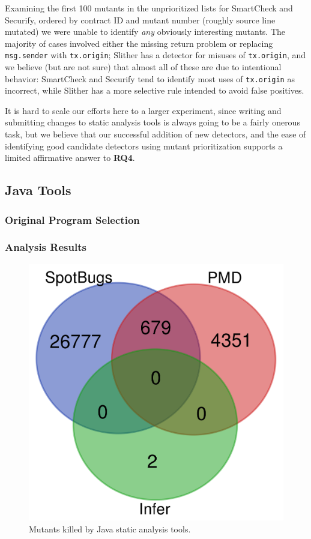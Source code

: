 Examining the first 100 mutants in the unprioritized lists for SmartCheck and Securify, ordered by contract ID and mutant number (roughly source line mutated) we were unable to identify \emph{any} obviously interesting mutants.  The majority of cases involved either the missing return problem or replacing {\tt msg.sender} with {\tt tx.origin}; Slither has a detector for misuses of {\tt tx.origin}, and we believe (but are not sure) that almost all of these are due to intentional behavior: SmartCheck and Securify tend to identify most uses of {\tt tx.origin} as incorrect, while Slither has a more selective rule intended to avoid false positives.

It is hard to scale our efforts here to a larger experiment, since writing and submitting changes to static analysis tools is always going to be a fairly onerous task, but we believe that our successful addition of new detectors, and the ease of identifying good candidate detectors using mutant prioritization supports a limited affirmative answer to {\bf RQ4}.



\subsection{Java Tools}

\subsubsection{Original Program Selection}

\subsubsection{Analysis Results}

\begin{figure}
  \includegraphics[width=\columnwidth]{java.png}
  \caption{Mutants killed by Java static analysis tools.}
  \label{fig:javavenn}
\end{figure}

